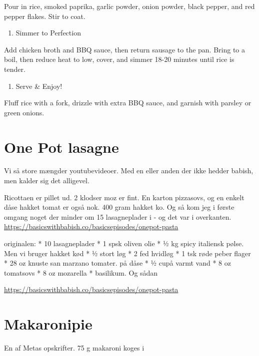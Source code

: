 \documentclass[
]{book}
\providecommand{\tightlist}{%
  \setlength{\itemsep}{0pt}\setlength{\parskip}{0pt}}
\begin{document}
Pour in rice, smoked paprika, garlic powder, onion powder, black pepper, and red pepper flakes. Stir to coat.

\begin{enumerate}
\def\labelenumi{\arabic{enumi}.}
\setcounter{enumi}{3}
\tightlist
\item
  Simmer to Perfection
\end{enumerate}

Add chicken broth and BBQ sauce, then return sausage to the pan.
Bring to a boil, then reduce heat to low, cover, and simmer 18-20 minutes until rice is tender.

\begin{enumerate}
\def\labelenumi{\arabic{enumi}.}
\setcounter{enumi}{4}
\tightlist
\item
  Serve \& Enjoy!
\end{enumerate}

Fluff rice with a fork, drizzle with extra BBQ sauce, and garnish with parsley or green onions.

\hypertarget{one-pot-lasagne-1}{%
\section{One Pot lasagne}\label{one-pot-lasagne-1}}

Vi så store mængder youtubevideoer. Med en eller anden der ikke hedder babish, men kalder sig det alligevel.

Ricottaen er pillet ud. 2 klodser moz er fint. En karton pizzasovs, og en enkelt dåse hakket tomat er også nok.
400 gram hakket ko.
Og så kom jeg i første omgang noget der minder om 15 lasagneplader i - og det var i overkanten.
\url{https://basicswithbabish.co/basicsepisodes/onepot-pasta}

originalen:
* 10 lasagneplader
* 1 spsk oliven olie
* ½ kg spicy italiensk pølse. Men vi bruger hakket kød
* ½ stort løg
* 2 fed hvidløg
* 1 tsk røde peber flager
* 28 oz knuste san marzano tomater. på dåse
* ½ cupå varmt vand
* 8 oz tomatsovs
* 8 oz mozarella
* basilikum. Og sådan

\url{https://basicswithbabish.co/basicsepisodes/onepot-pasta}

\hypertarget{makaronipie}{%
\section{Makaronipie}\label{makaronipie}}

En af Metas opskrifter.
75 g makaroni koges i
\end{document}
